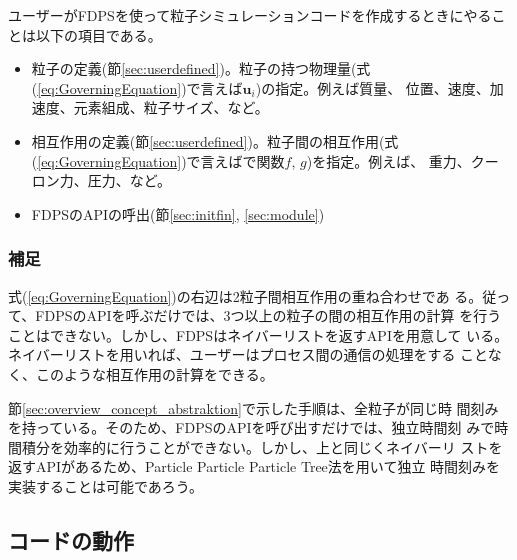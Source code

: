 ユーザーがFDPSを使って粒子シミュレーションコードを作成するときにやるこ
とは以下の項目である。
\begin{itemize}


    
\item 粒子の定義(節\ref{sec:userdefined})。粒子の持つ物理量(式
  (\ref{eq:GoverningEquation})で言えば$\bm{u}_i$)の指定。例えば質量、
  位置、速度、加速度、元素組成、粒子サイズ、など。

\item 相互作用の定義(節\ref{sec:userdefined})。粒子間の相互作用(式
  (\ref{eq:GoverningEquation})で言えばで関数$f$, $g$)を指定。例えば、
  重力、クーロン力、圧力、など。

\item FDPSのAPIの呼出(節\ref{sec:initfin}, \ref{sec:module})

\end{itemize}

\subsubsection{補足}

式(\ref{eq:GoverningEquation})の右辺は2粒子間相互作用の重ね合わせであ
る。従って、FDPSのAPIを呼ぶだけでは、3つ以上の粒子の間の相互作用の計算
を行うことはできない。しかし、FDPSはネイバーリストを返すAPIを用意して
いる。ネイバーリストを用いれば、ユーザーはプロセス間の通信の処理をする
ことなく、このような相互作用の計算をできる。

節\ref{sec:overview_concept_abstraktion}で示した手順は、全粒子が同じ時
間刻みを持っている。そのため、FDPSのAPIを呼び出すだけでは、独立時間刻
みで時間積分を効率的に行うことができない。しかし、上と同じくネイバーリ
ストを返すAPIがあるため、Particle Particle Particle Tree法を用いて独立
時間刻みを実装することは可能であろう。


\subsection{コードの動作}
\label{sec:overview_action}

